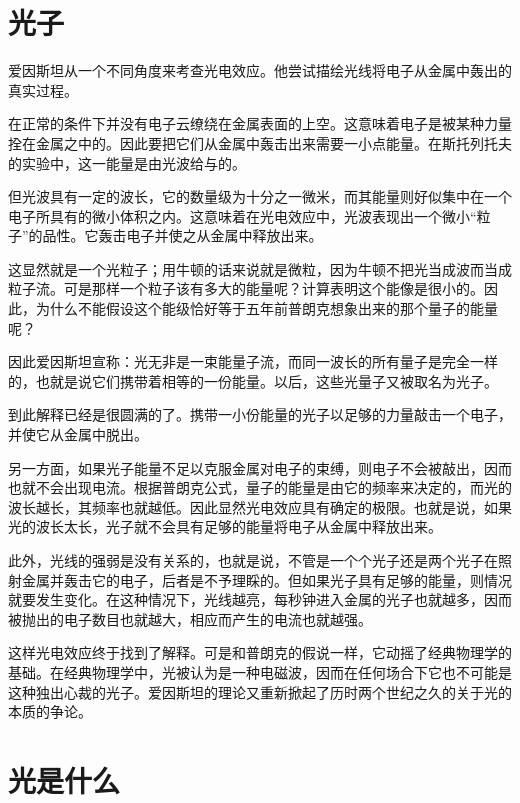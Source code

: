 \section{光子}

爱因斯坦从一个不同角度来考查光电效应。他尝试描绘光线将电子从金属中轰出的真实过程。

在正常的条件下并没有电子云缭绕在金属表面的上空。这意味着电子是被某种力量拴在金属之中的。因此要把它们从金属中轰击出来需要一小点能量。在斯托列托夫的实验中，这一能量是由光波给与的。

但光波具有一定的波长，它的数量级为十分之一微米，而其能量则好似集中在一个电子所具有的微小体积之内。这意味着在光电效应中，光波表现出一个微小“粒子”的品性。它轰击电子并使之从金属中释放出来。

这显然就是一个光粒子；用牛顿的话来说就是微粒，因为牛顿不把光当成波而当成粒子流。可是那样一个粒子该有多大的能量呢？计算表明这个能像是很小的。因此，为什么不能假设这个能级恰好等于五年前普朗克想象出来的那个量子的能量呢？

因此爱因斯坦宣称：光无非是一束能量子流，而同一波长的所有量子是完全一样的，也就是说它们携带着相等的一份能量。以后，这些光量子又被取名为光子。

到此解释已经是很圆满的了。携带一小份能量的光子以足够的力量敲击一个电子，并使它从金属中脱出。

另一方面，如果光子能量不足以克服金属对电子的束缚，则电子不会被敲出，因而也就不会出现电流。根据普朗克公式，量子的能量是由它的频率来决定的，而光的波长越长，其频率也就越低。因此显然光电效应具有确定的极限。也就是说，如果光的波长太长，光子就不会具有足够的能量将电子从金属中释放出来。

此外，光线的强弱是没有关系的，也就是说，不管是一个个光子还是两个光子在照射金属并轰击它的电子，后者是不予理睬的。但如果光子具有足够的能量，则情况就要发生变化。在这种情况下，光线越亮，每秒钟进入金属的光子也就越多，因而被抛出的电子数目也就越大，相应而产生的电流也就越强。

这样光电效应终于找到了解释。可是和普朗克的假说一样，它动摇了经典物理学的基础。在经典物理学中，光被认为是一种电磁波，因而在任何场合下它也不可能是这种独出心裁的光子。爱因斯坦的理论又重新掀起了历时两个世纪之久的关于光的本质的争论。

\section{光是什么}

